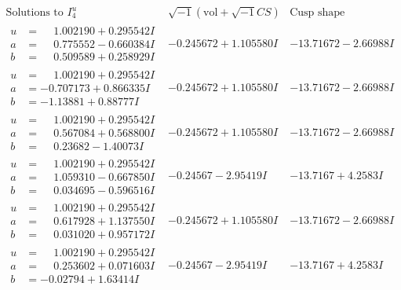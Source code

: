 \documentclass[1p]{elsarticle_modified}
\theoremstyle{definition}
\newcommand{\I}{\sqrt{-1}}
\begin{document}
$$\begin{array}{c|c|c}  
\text{Solutions to }I^u_{4}& \I (\text{vol} + \sqrt{-1}CS) & \text{Cusp shape}\\
 \hline 
\begin{aligned}
u &= \phantom{-}1.002190 + 0.295542 I \\
a &= \phantom{-}0.775552 - 0.660384 I \\
b &= \phantom{-}0.509589 + 0.258929 I\end{aligned}
 & -0.245672 + 1.105580 I & -13.71672 - 2.66988 I \\ \hline\begin{aligned}
u &= \phantom{-}1.002190 + 0.295542 I \\
a &= -0.707173 + 0.866335 I \\
b &= -1.13881 + 0.88777 I\end{aligned}
 & -0.245672 + 1.105580 I & -13.71672 - 2.66988 I \\ \hline\begin{aligned}
u &= \phantom{-}1.002190 + 0.295542 I \\
a &= \phantom{-}0.567084 + 0.568800 I \\
b &= \phantom{-}0.23682 - 1.40073 I\end{aligned}
 & -0.245672 + 1.105580 I & -13.71672 - 2.66988 I \\ \hline\begin{aligned}
u &= \phantom{-}1.002190 + 0.295542 I \\
a &= \phantom{-}1.059310 - 0.667850 I \\
b &= \phantom{-}0.034695 - 0.596516 I\end{aligned}
 & -0.24567 - 2.95419 I & -13.7167 + 4.2583 I \\ \hline\begin{aligned}
u &= \phantom{-}1.002190 + 0.295542 I \\
a &= \phantom{-}0.617928 + 1.137550 I \\
b &= \phantom{-}0.031020 + 0.957172 I\end{aligned}
 & -0.245672 + 1.105580 I & -13.71672 - 2.66988 I \\ \hline\begin{aligned}
u &= \phantom{-}1.002190 + 0.295542 I \\
a &= \phantom{-}0.253602 + 0.071603 I \\
b &= -0.02794 + 1.63414 I\end{aligned}
 & -0.24567 - 2.95419 I & -13.7167 + 4.2583 I \\ \hline\begin{aligned}

\end{aligned}
\end{array}$$
\end{document}
